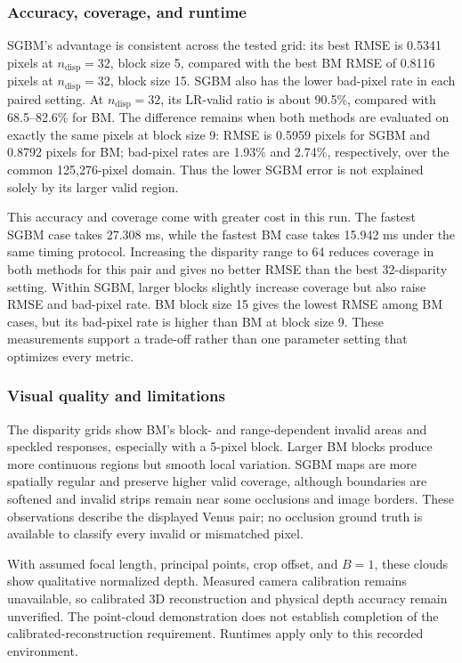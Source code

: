 \documentclass[a4paper,12pt]{article}
\begin{document}
\subsubsection{Accuracy, coverage, and runtime}
SGBM's advantage is consistent across the tested grid: its best RMSE is 0.5341 pixels at $n_{\mathrm{disp}}=32$, block size 5, compared with the best BM RMSE of 0.8116 pixels at $n_{\mathrm{disp}}=32$, block size 15. SGBM also has the lower bad-pixel rate in each paired setting. At $n_{\mathrm{disp}}=32$, its LR-valid ratio is about 90.5\%, compared with 68.5--82.6\% for BM. The difference remains when both methods are evaluated on exactly the same pixels at block size 9: RMSE is 0.5959 pixels for SGBM and 0.8792 pixels for BM; bad-pixel rates are 1.93\% and 2.74\%, respectively, over the common 125,276-pixel domain. Thus the lower SGBM error is not explained solely by its larger valid region.

This accuracy and coverage come with greater cost in this run. The fastest SGBM case takes 27.308 ms, while the fastest BM case takes 15.942 ms under the same timing protocol. Increasing the disparity range to 64 reduces coverage in both methods for this pair and gives no better RMSE than the best 32-disparity setting. Within SGBM, larger blocks slightly increase coverage but also raise RMSE and bad-pixel rate. BM block size 15 gives the lowest RMSE among BM cases, but its bad-pixel rate is higher than BM at block size 9. These measurements support a trade-off rather than one parameter setting that optimizes every metric.

\subsubsection{Visual quality and limitations}
The disparity grids show BM's block- and range-dependent invalid areas and speckled responses, especially with a 5-pixel block. Larger BM blocks produce more continuous regions but smooth local variation. SGBM maps are more spatially regular and preserve higher valid coverage, although boundaries are softened and invalid strips remain near some occlusions and image borders. These observations describe the displayed Venus pair; no occlusion ground truth is available to classify every invalid or mismatched pixel.

With assumed focal length, principal points, crop offset, and $B=1$, these clouds show qualitative normalized depth. Measured camera calibration remains unavailable, so calibrated 3D reconstruction and physical depth accuracy remain unverified. The point-cloud demonstration does not establish completion of the calibrated-reconstruction requirement. Runtimes apply only to this recorded environment.
\end{document}
